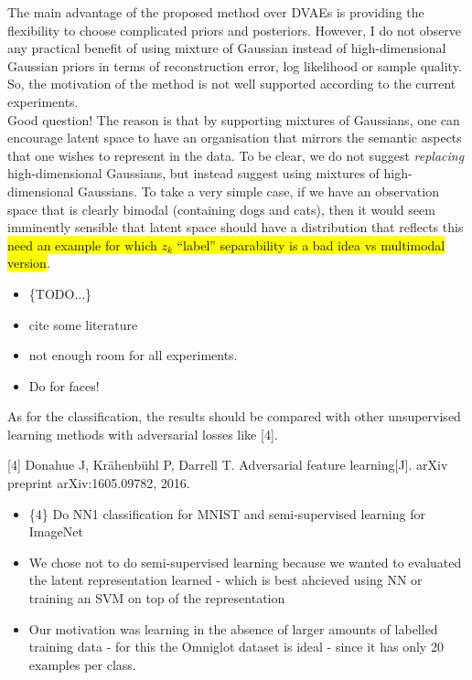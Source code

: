 \documentclass{article}
\begin{document}
{\color{blue}
The main advantage of the proposed method over DVAEs is providing the flexibility to choose complicated priors and posteriors. However, I do not observe any practical benefit of using mixture of Gaussian instead of high-dimensional Gaussian priors in terms of reconstruction error, log likelihood or sample quality. So, the motivation of the method is not well supported according to the current experiments.}\\

Good question!  The reason is that by supporting mixtures of Gaussians, one can encourage latent space to have an organisation that mirrors the semantic aspects that one wishes to represent in the data. To be clear, we do not suggest {\em replacing} high-dimensional Gaussians, but instead suggest using mixtures of high-dimensional Gaussians.   To take a very simple case, if we have an observation space that is clearly bimodal (containing dogs and cats), then it would seem imminently sensible that latent space should have a distribution that reflects this \hl{need an example for which $z_k$ ``label'' separability is a bad idea vs multimodal version}.\\

\begin{itemize}
    \item \{TODO...\}
    \item cite some literature
    \item not enough room for all experiments.
    \item Do for faces!
\end{itemize}

{\color{blue}
As for the classification, the results should be compared with other unsupervised learning methods with adversarial losses like [4].

[4] Donahue J, Krähenbühl P, Darrell T. Adversarial feature learning[J]. arXiv preprint arXiv:1605.09782, 2016.}

\begin{itemize}
    \item \{4\} Do NN1 classification for MNIST and semi-supervised learning for ImageNet
    \item We chose not to do semi-supervised learning because we wanted to evaluated the latent representation learned - which is best ahcieved using NN or training an SVM on top of the representation
    \item Our motivation was learning in the absence of larger amounts of labelled training data - for this the Omniglot dataset is ideal - since it has only 20 examples per class.
\end{itemize}
\end{document}
